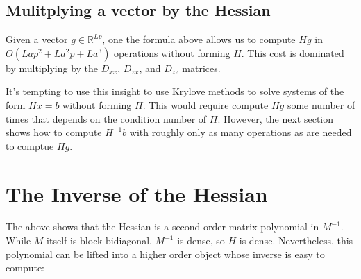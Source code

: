 \documentclass{article}
\begin{document}
\subsection{Mulitplying a vector by the Hessian}

Given a vector $g \in \mathbb{R}^{Lp}$, one the formula above allows us to
compute $H g$ in $O\left(Lap^2 + L a^2p +La^3\right)$ operations without
forming $H$. This cost is dominated by multiplying by the $D_{xx}$, $D_{zx}$,
and $D_{zz}$ matrices.

It's tempting to use this insight to use Krylove methods to solve systems of
the form $H x = b$ without forming $H$. This would require compute $H g$ some
number of times that depends on the condition number of $H$. However, the next
section shows how to compute $H^{-1} b$ with roughly only as many operations as
are needed to comptue $H g$.

\section{The Inverse of the Hessian}

The above shows that the Hessian is a second order matrix polynomial in
$M^{-1}$. While $M$ itself is block-bidiagonal, $M^{-1}$ is dense, so $H$ is
dense. Nevertheless, this polynomial can be lifted into a higher order object
whose inverse is easy to compute:
\end{document}
